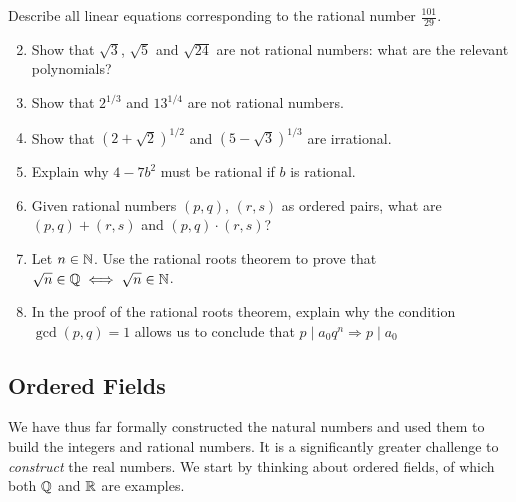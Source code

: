 \begin{exercises}{}
	\exstart Describe all linear equations corresponding to the rational number $\frac{101}{29}$.\vspace{-5pt}
	
	\begin{enumerate}\setcounter{enumi}{1}
	  \item %
	  Show that $\sqrt 3$, $\sqrt 5$ and $\sqrt{24}$ are not rational numbers: what are the relevant polynomials?
	  
	  
	  \item %
	  Show that $2^{1/3}$ and $13^{1/4}$ are not rational numbers.
	
	
	  \item%
	  Show that $(2+\sqrt 2)^{1/2}$ and $(5-\sqrt 3)^{1/3}$ are irrational.
	  
	  
	  
	  
	  
	  
	  \item%
	  Explain why $4-7b^2$ must be rational if $b$ is rational.
	  
	  
	  \item\label{exs:ratnumber+x} Given rational numbers $(p,q)$, $(r,s)$ as ordered pairs, what are $(p,q)+(r,s)$ and $(p,q)\cdot(r,s)$?
	  
	  
	  \item Let $n\in\mathbb{N}$. Use the rational roots theorem to prove that $\sqrt n\in\mathbb{Q}\iff \sqrt n\in\mathbb{N}$.
	  
	  
	  \item In the proof of the rational roots theorem, explain why the condition $\gcd(p,q)=1$ allows us to conclude that $p\mid a_0q^n\Longrightarrow p\mid a_0$
	\end{enumerate}
\end{exercises}


\clearpage



\subsection{Ordered Fields}

We have thus far formally constructed the natural numbers and used them to build the integers and rational numbers. It is a significantly greater challenge to \emph{construct} the real numbers. We start by thinking about ordered fields, of which both $\mathbb{Q}$ and $\mathbb{R}$ are examples.

